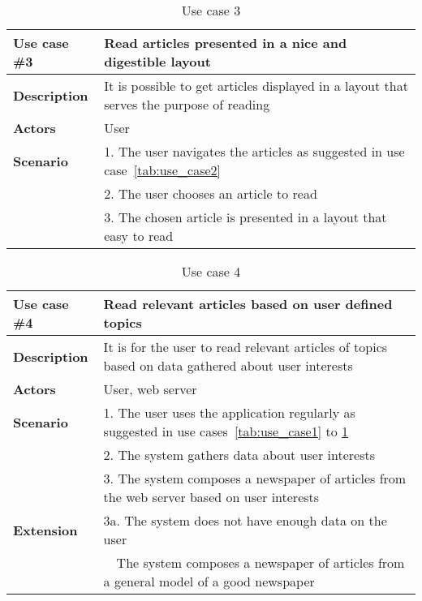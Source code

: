 \begin{table}[h!tp]
\myfloatalign
	\begin{tabular}{p{}|p{}} \toprule 
		\textbf{Use case \#3} & Read articles presented in a nice and digestible layout\\ \midrule
		\textbf{Description} & It is possible to get articles displayed in a layout that serves the purpose of reading\\ \midrule
		\textbf{Actors} & User\\ \midrule
		\textbf{Scenario} 	& 1. The user navigates the articles as suggested in use case~\ref{tab:use_case2}\\
								& 2. The user chooses an article to read\\
								& 3. The chosen article is presented in a layout that easy to read\\ \bottomrule
	\end{tabular}
\caption{Use case 3}
\label{tab:use_case3}
\end{table}

\begin{table}[h!tp]
\myfloatalign
	\begin{tabular}{p{}|p{}} \toprule 
		\textbf{Use case \#4} & Read relevant articles based on user defined topics\\ \midrule
		\textbf{Description} & It is for the user to read relevant articles of topics based on data gathered about user interests\\ \midrule
		\textbf{Actors} & User, web server\\ \midrule
		\textbf{Scenario} 	& 1. The user uses the application regularly as suggested in use cases~\ref{tab:use_case1} to \ref{tab:use_case3}\\
								& 2. The system gathers data about user interests\\
								& 3. The system composes a newspaper of articles from the web server based on user interests\\ \midrule
		\textbf{Extension}	& 3a. The system does not have enough data on the user\\
										& \ \ The system composes a newspaper of articles from a general model of a good newspaper\\
										 \bottomrule
	\end{tabular}
\caption{Use case 4}
\label{tab:use_case4}
\end{table}

